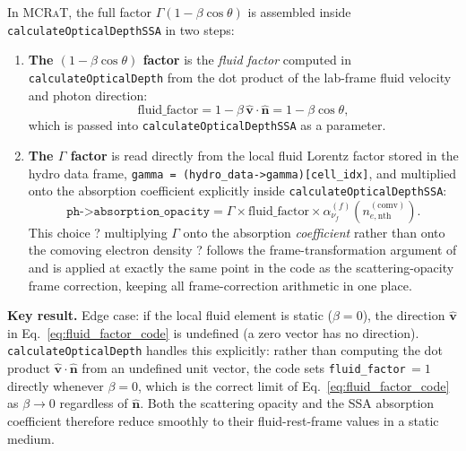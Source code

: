 \documentclass[12pt,a4paper]{article}
\newcommand{\nuf}{\nu_{\!f}}
\newcommand{\code}[1]{\texttt{#1}}
\newcommand{\mcrat}{\textsc{MCRaT}}
\newenvironment{keyresult}{%
	\begin{framed}\noindent\textbf{Key result.}\quad}
	{\end{framed}}
\begin{document}
In \mcrat{}, the full factor $\Gamma(1-\beta\cos\theta)$ is assembled
inside \code{calculateOpticalDepthSSA} in two steps:

\begin{enumerate}[leftmargin=2em]
	\item \textbf{The $(1-\beta\cos\theta)$ factor} is the
	\emph{fluid factor} computed in \code{calculateOpticalDepth} from
	the dot product of the lab-frame fluid velocity and photon direction:
	\begin{equation}
		\mathrm{fluid\_factor}
		= 1 - \beta\,\hat{\mathbf{v}}\cdot\hat{\mathbf{n}}
		= 1 - \beta\cos\theta,
		\label{eq:fluid_factor_code}
	\end{equation}
	which is passed into \code{calculateOpticalDepthSSA} as a parameter.
	
	\item \textbf{The $\Gamma$ factor} is read directly from the local
	fluid Lorentz factor stored in the hydro data frame,
	\code{gamma = (hydro\_data->gamma)[cell\_idx]}, and multiplied onto
	the absorption coefficient explicitly inside
	\code{calculateOpticalDepthSSA}:
	\begin{equation}
		\code{ph->absorption\_opacity}
		= \Gamma
		\times \mathrm{fluid\_factor}
		\times \alpha_{\nuf}^{(f)}\!\left(n_{e,\mathrm{nth}}^{(\mathrm{comv})}\right).
		\label{eq:abs_od_stored}
	\end{equation}
	This choice ? multiplying $\Gamma$ onto the absorption
	\emph{coefficient} rather than onto the comoving electron density ?
	follows the frame-transformation argument of \citet{abramowicz1991}
	and is applied at exactly the same point in the code as the
	scattering-opacity frame correction, keeping all frame-correction
	arithmetic in one place.
\end{enumerate}

\begin{keyresult}
	Edge case: if the local fluid element is static ($\beta=0$), the
	direction $\hat{\mathbf{v}}$ in Eq.~\eqref{eq:fluid_factor_code} is
	undefined (a zero vector has no direction). \code{calculateOpticalDepth}
	handles this explicitly: rather than computing the dot product
	$\hat{\mathbf{v}}\cdot\hat{\mathbf{n}}$ from an undefined unit vector,
	the code sets \code{fluid\_factor}$\,=1$ directly whenever $\beta=0$,
	which is the correct limit of Eq.~\eqref{eq:fluid_factor_code} as
	$\beta\to0$ regardless of $\hat{\mathbf{n}}$. Both the scattering
	opacity and the SSA absorption coefficient therefore reduce smoothly
	to their fluid-rest-frame values in a static medium.
\end{keyresult}
\end{document}
